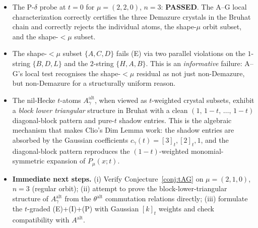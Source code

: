 \documentclass[11pt]{article}
\theoremstyle{definition}
\newcommand{\Aalt}{A^{\mathrm{alt}}}
\newcommand{\thalt}{\theta^{\mathrm{alt}}}
\begin{document}
\begin{itemize}
\item The P-$\delta$ probe at $t=0$ for $\mu=(2,2,0)$, $n=3$: \textbf{PASSED}. The A--G local characterization correctly certifies the three Demazure crystals in the Bruhat chain and correctly rejects the individual atoms, the shape-$\mu$ orbit subset, and the shape-$<\mu$ subset.

\item The shape-$<\mu$ subset $\{A,C,D\}$ fails (E) via two parallel violations on the $1$-string $\{B,D,L\}$ and the $2$-string $\{H,A,B\}$. This is an \emph{informative} failure: A--G's local test recognises the shape-$<\mu$ residual as not just non-Demazure, but non-Demazure for a structurally uniform reason.

\item The nil-Hecke $t$-atoms $\Aalt_\gamma$, when viewed as $t$-weighted crystal subsets, exhibit a \emph{block lower triangular} structure in Bruhat with a clean $(1,\,1-t,\,\dots,\,1-t)$ diagonal-block pattern and pure-$t$ shadow entries. This is the algebraic mechanism that makes Clio's Dim Lemma work: the shadow entries are absorbed by the Gaussian coefficients $c_\gamma(t) = [3]_t, [2]_t, 1$, and the diagonal-block pattern reproduces the $(1-t)$-weighted monomial-symmetric expansion of $P_\mu(x;t)$.

\item \textbf{Immediate next steps.} (i) Verify Conjecture~\ref{conj:tAG} on $\mu=(2,1,0)$, $n=3$ (regular orbit); (ii) attempt to prove the block-lower-triangular structure of $\Aalt_\gamma$ from the $\thalt$ commutation relations directly; (iii) formulate the $t$-graded (E)+(I)+(P) with Gaussian $[k]_t$ weights and check compatibility with $\Aalt$.
\end{itemize}
\end{document}
